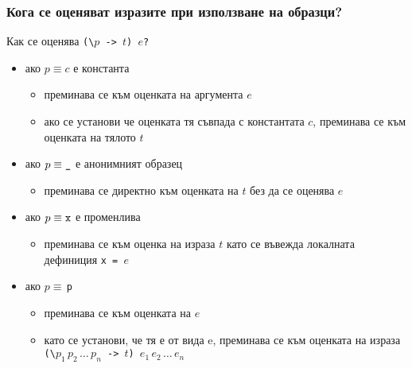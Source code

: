 \documentclass[alsotrans,beameroptions={aspectratio=169}]{beamerswitch}
\begin{document}
\begin{frame}
  \frametitle{Кога се оценяват изразите при използване на образци?}

  Как се оценява \tt{(\textbackslash $p$ -> $t$) $e$}?\pause
  \begin{itemize}[<+->]
  \item ако $p \equiv c$ е константа
    \begin{itemize}
    \item преминава се към оценката на аргумента $e$
    \item ако се установи че оценката тя съвпада с константата $c$, преминава се към оценката на тялото $t$
    \end{itemize}
  \item ако $p \equiv \tt\_$ е анонимният образец
    \begin{itemize}
    \item преминава се директно към оценката на $t$ \alert{без да се оценява $e$}
    \end{itemize}
  \item ако $p \equiv \tt x$ е променлива
    \begin{itemize}
    \item преминава се към оценка на израза $t$ \alert{като се въвежда локалната дефиниция \tt{x = $e$}}
    \end{itemize}
  \item ако \tt{$p \equiv\,$\tuple p}
    \begin{itemize}
    \item преминава се към оценката на $e$
    \item като се установи, че тя е от вида \tuple e, преминава се към оценката на израза \tt{(\textbackslash $p_1\,p_2\,\ldots\,p_n$ -> $t$) $e_1\,e_2\,\ldots\,e_n$}
    \end{itemize}
  \end{itemize}
\end{frame}
\end{document}
